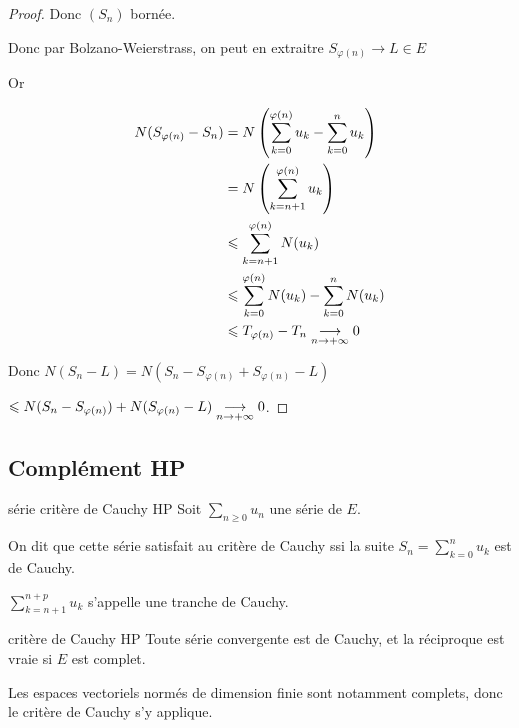 \begin{proof}
    Donc $(S_n)$ bornée. 

    Donc par Bolzano-Weierstrass, on peut en extraitre $S_{\varphi(n)} \to L \in E$

    Or 

    \begin{align*}
        N(S_{\varphi(n)} - S_n) & = N\left( \sum_{k = 0 }^{\varphi(n)} u_k - \sum_{k = 0 }^{n } u_k \right) \\
                                & = N \left( \sum_{k = n + 1 }^{\varphi(n)} u_k \right) \\
                                & \leqslant \sum_{k = n + 1 }^{\varphi(n)} N(u_k) \\
                                & \leqslant \sum_{k = 0 }^{\varphi(n) } N(u_k) - \sum_{k = 0 }^{n } N(u_k) \\
                                & \leqslant T_{\varphi(n)} - T_n \underset{n \to + \infty}{\longrightarrow} 0
    \end{align*}

    Donc $N(S_n - L) = N(S_n - S_{\varphi(n)} + S_{\varphi(n)} - L)$

    \qquad \qquad \qquad $ \leqslant N(S_n - S_{\varphi(n)}) + N(S_{\varphi(n)} - L) \underset{n \to + \infty}{\longrightarrow} 0$.
\end{proof}

\subsection{Complément HP }

\begin{definition}{série critère de Cauchy HP}{}
    Soit $\sum_{n \geqslant 0} u_n$ une série de $E$.

    On dit que cette série satisfait au critère de Cauchy ssi la suite $\displaystyle S_n = \sum_{k = 0}^n u_k$ 
    est de Cauchy. 

    $\displaystyle \sum_{k = n + 1}^{n + p} u_k$ s'appelle une tranche de Cauchy. 
\end{definition}

\begin{theoreme}{critère de Cauchy HP}{}
    Toute série convergente est de Cauchy, et la réciproque est vraie si $E$ est complet.
\end{theoreme}

\begin{remarque}
    Les espaces vectoriels normés de dimension finie sont notamment complets, donc 
    le critère de Cauchy s'y applique.
\end{remarque}


